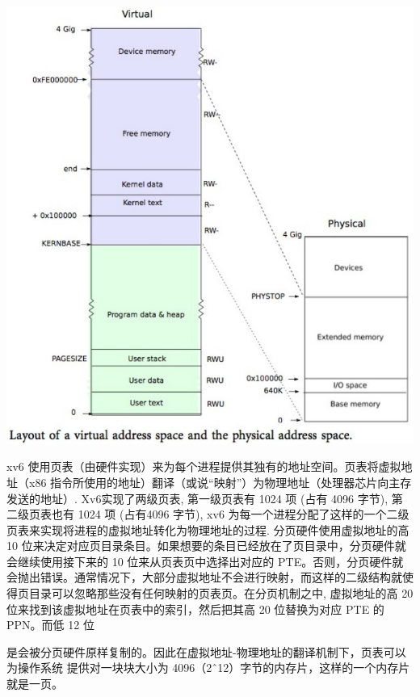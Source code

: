 \includegraphics[width=6in]{figures/mem/fig2.png}

xv6 使用页表（由硬件实现）来为每个进程提供其独有的地址空间。页表将虚拟地址（x86 指令所使用的地址）翻译（或说“映射”）为物理地址（处理器芯片向主存发送的地址）.  Xv6实现了两级页表, 第一级页表有 1024 项 (占有 4096 字节), 第二级页表也有 1024 项 (占有4096 字节), xv6 为每一个进程分配了这样的一个二级页表来实现将进程的虚拟地址转化为物理地址的过程. 分页硬件使用虚拟地址的高 10 位来决定对应页目录条目。如果想要的条目已经放在了页目录中，分页硬件就会继续使用接下来的 10 位来从页表页中选择出对应的 PTE。否则，分页硬件就会抛出错误。通常情况下，大部分虚拟地址不会进行映射，而这样的二级结构就使得页目录可以忽略那些没有任何映射的页表页。在分页机制之中, 虚拟地址的高 20 位来找到该虚拟地址在页表中的索引，然后把其高 20 位替换为对应 PTE 的 PPN。而低 12 位

是会被分页硬件原样复制的。因此在虚拟地址-物理地址的翻译机制下，页表可以为操作系统     提供对一块块大小为 4096（2ˆ12）字节的内存片，这样的一个内存片就是一页。

